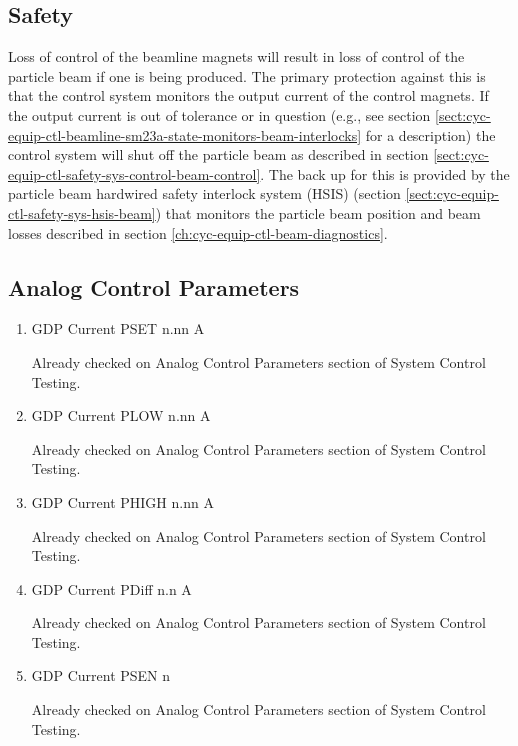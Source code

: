 \documentclass[11pt]{book}		%
\begin{document}
\subsection{Safety}

Loss of control of the beamline magnets will result in loss of control of the particle beam if one is being produced.  The primary protection against this is that the control system monitors the output current of the control magnets.  If the output current is out of tolerance or in question (e.g., see section \ref{sect:cyc-equip-ctl-beamline-sm23a-state-monitors-beam-interlocks} for a description) the control system will shut off the particle beam as described in section \ref{sect:cyc-equip-ctl-safety-sys-control-beam-control}.  The back up for this is provided by the particle beam hardwired safety interlock system (HSIS) (section \ref{sect:cyc-equip-ctl-safety-sys-hsis-beam}) that monitors the particle beam position and beam losses described in section \ref{ch:cyc-equip-ctl-beam-diagnostics}.


\subsection{Analog Control Parameters}

\begin{enumerate}
 \item GDP Current PSET  n.nn A

\color{red}
Already checked on Analog Control Parameters section of System Control Testing.
\color{black}

 \item GDP Current PLOW  n.nn A

\color{red}
Already checked on Analog Control Parameters section of System Control Testing.
\color{black}

 \item GDP Current PHIGH n.nn A

\color{red}
Already checked on Analog Control Parameters section of System Control Testing.
\color{black}

 \item GDP Current PDiff n.n A

\color{red}
Already checked on Analog Control Parameters section of System Control Testing.
\color{black}

 \item GDP Current PSEN  n

\color{red}
Already checked on Analog Control Parameters section of System Control Testing.
\color{black}

\end{enumerate}
\end{document}
